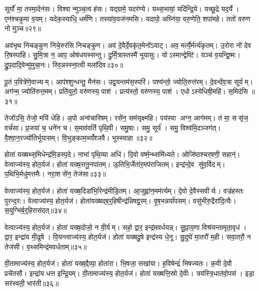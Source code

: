 सूर्यो॑ मा॒ तस्मा॒देन॑सः। विश्वान्मुञ्च॒त्वह॑सः। यद्ग्रामे॒ यदर॑ण्ये। यथ्स॒भायां॒ यदि॑न्द्रि॒ये। यच्छू॒द्रे यद॒र्ये। एन॑श्चकृ॒मा व॒यम्। यदेक॒स्याधि॒ धर्म॑णि। तस्या॑व॒यज॑नमसि। यदापो॒ अघ्नि॑या॒ वरु॒णेति॒ शपा॑महे। ततो॑ वरुण नो मुञ्च॥२९॥

अव॑भृथ निचङ्कुण निचे॒रुर॑सि निचङ्कुण। अव॑ दे॒वैर्दे॒वकृ॑त॒मेनो॑ऽयाट्। अव॒ मर्त्यै॒र्मर्त्य॑कृतम्। उ॒रोरा नो॑ देव रि॒षस्पा॑हि। सु॒मि॒त्रा न॒ आप॒ ओष॑धयस्सन्तु। दु॒र्मि॒त्रास्तस्मै॑ भूयासुः। योऽस्मान्द्वेष्टि॑। यञ्च॑ व॒यन्द्वि॒ष्मः। द्रु॒प॒दादि॒वेन्मु॑मुचा॒नः। स्वि॒न्नस्स्ना॒त्वी मला॑दिव॥३०॥

पू॒तं प॒वित्रे॑णे॒वाज्यम्। आप॑श्शुन्धन्तु॒ मैन॑सः। उद्व॒यन्तम॑स॒स्परि॑। पश्य॑न्तो॒ ज्योति॒रुत्त॑रम्। दे॒वन्दे॑व॒त्रा सूर्यम्। अग॑न्म॒ ज्योति॑रुत्त॒मम्। प्रति॑युतो॒ वरु॑णस्य॒ पाश॑। प्रत्य॑स्तो॒ वरु॑णस्य॒ पाश॑। एधोऽस्येधिषी॒महि॑। स॒मिद॑सि ॥३१॥

तेजो॑ऽसि॒ तेजो॒ मयि॑ धेहि। अ॒पो अन्व॑चारिषम्। रसे॑न॒ सम॑सृक्ष्महि। पय॑स्वा अग्न॒ आग॑मम्। तं मा॒ ससृ॑ज॒ वर्च॑सा। प्र॒जया॑ च॒ धने॑न च। स॒माव॑वर्ति पृथि॒वी। समु॒षाः। समु॒ सूर्य॑। समु॒ विश्व॑मि॒दञ्जग॑त्। वै॒श्वा॒न॒रज्यो॑तिर्भूयासम्। वि॒भुङ्काम॒व्व्यँ॑श्ञवै। भूस्स्वाहा॥३२॥\anuvakamend[स्वप्न॒ एनासि चकृ॒मा व॒यं मु॑ञ्च॒ मला॑दिव स॒मिद॑सि॒ जग॒त्रीणि॑ च]

होता॑ यख्षथ्स॒मिधेन्द्र॑मि॒डस्प॒दे। नाभा॑ पृथि॒व्या अधि॑। दि॒वो वर्ष्म॒न्थ्समि॑ध्यते। ओजि॑ष्ठश्चर्‌षणी॒ सहान्॑। वेत्वाज्य॑स्य॒ होत॒र्यज॑। होता॑ यख्ष॒त्तनू॒नपा॑तम्। ऊ॒तिभि॒र्जेता॑र॒मप॑राजितम्। इन्द्र॑न्दे॒व सु॑व॒र्विदम्। प॒थिभि॒र्मधु॑मत्तमैः। नरा॒शसे॑न॒ तेज॑सा॥३३॥

वेत्वाज्य॑स्य॒ होत॒र्यज॑। होता॑ यख्ष॒दिडा॑भि॒रिन्द्र॑मीडि॒तम्। आ॒जुह्वा॑न॒मम॑र्त्यम्। दे॒वो दे॒वैस्सवीर्यः। वज्र॑हस्तः पुरन्द॒रः। वेत्वाज्य॑स्य॒ होत॒र्यज॑। होता॑यख्षद्ब॒र्॒हिषीन्द्र॑न्निषद्व॒रम्। वृ॒ष॒भन्नर्या॑पसम्। वसु॑भीरु॒द्रैरा॑दि॒त्यैः। स॒युग्भि॑र्ब॒र्॒हिरास॑दत्॥३४॥

वेत्वाज्य॑स्य॒ होत॒र्यज॑। होता॑ यख्ष॒दोजो॒ न वी॒र्यम्। सहो॒ द्वार॒ इन्द्र॑मवर्धयन्न्। सु॒प्रा॒य॒णा विश्र॑यन्तामृता॒वृध॑। द्वार॒ इन्द्रा॑य मी॒ढुषे। वि॒यन्त्वाज्य॑स्य॒ होत॒र्यज॑। होता॑ यख्षदु॒षे इन्द्र॑स्य धे॒नू। सु॒दुघे॑ मा॒तरौ॑ म॒ही। सवा॒तरौ॒ न तेज॑सी। व॒थ्समिन्द्र॑मवर्धताम्॥३५॥

वी॒तामाज्य॑स्य॒ होत॒र्यज॑। होता॑ यख्ष॒द्दैव्या॒ होता॑रा। भि॒षजा॒ सखा॑या। ह॒विषेन्द्रं॑ भिषज्यतः। क॒वी दे॒वौ प्रचे॑तसौ। इन्द्रा॑य धत्त इन्द्रि॒यम्। वी॒तामाज्य॑स्य॒ होत॒र्यज॑। होता॑ यख्षत्ति॒स्रो दे॒वीः। त्रय॑स्त्रि॒धात॑वो॒पस॑। इडा॒ सर॑स्वती॒ भार॑ती॥३६॥


